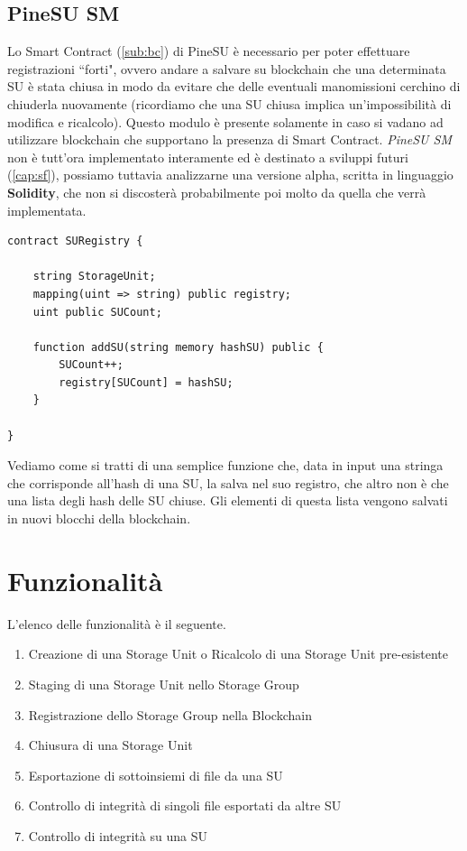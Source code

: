 \newpage

\subsection{PineSU SM}
\label{sub:sm}
Lo Smart Contract (\autoref{sub:bc}) di PineSU è necessario
per poter effettuare registrazioni ``forti", ovvero andare a salvare su blockchain
che una determinata SU è stata chiusa in modo da evitare che delle eventuali manomissioni
cerchino di chiuderla nuovamente (ricordiamo che una SU chiusa implica un'impossibilità di modifica e ricalcolo).
Questo modulo è presente solamente in caso si vadano ad utilizzare blockchain che
supportano la presenza di Smart Contract.
\emph{PineSU SM} non è tutt'ora implementato interamente ed è destinato a sviluppi futuri (\autoref{cap:sf}),
possiamo tuttavia analizzarne una versione alpha, scritta in linguaggio \textbf{Solidity}, 
che non si discosterà probabilmente poi molto da quella che verrà implementata.

\vspace{\baselineskip}

\begin{lstlisting}[language=Solidity]
contract SURegistry {

    string StorageUnit;
    mapping(uint => string) public registry;
    uint public SUCount;

    function addSU(string memory hashSU) public {
        SUCount++;
        registry[SUCount] = hashSU;
    }

}
\end{lstlisting}
Vediamo come si tratti di una semplice funzione che, data in input una stringa
che corrisponde all'hash di una SU, la salva nel suo registro, che altro non è che una
lista degli hash delle SU chiuse. Gli elementi di questa lista vengono salvati in nuovi
blocchi della blockchain.

\newpage

\section{Funzionalità}

L'elenco delle funzionalità è il seguente.

\begin{enumerate}
    \item Creazione di una Storage Unit o Ricalcolo di una Storage Unit pre-esistente
    \item Staging di una Storage Unit nello Storage Group
    \item Registrazione dello Storage Group nella Blockchain
    \item Chiusura di una Storage Unit
    \item Esportazione di sottoinsiemi di file da una SU
    \item Controllo di integrità di singoli file esportati da altre SU
    \item Controllo di integrità su una SU
\end{enumerate}


